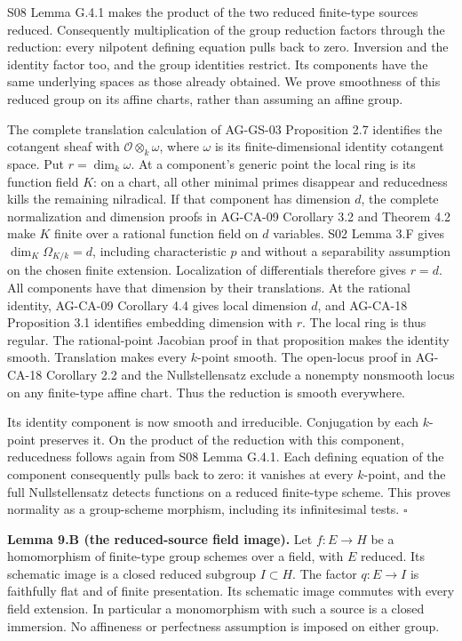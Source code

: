 \documentclass[11pt,a4paper,openany]{report}
\newcounter{none}
\begin{document}
S08 Lemma G.4.1 makes the product of the two reduced finite-type sources reduced. Consequently multiplication of the group reduction factors through the reduction: every nilpotent defining equation pulls back to zero. Inversion and the identity factor too, and the group identities restrict. Its components have the same underlying spaces as those already obtained. We prove smoothness of this reduced group on its affine charts, rather than assuming an affine group.

The complete translation calculation of AG-GS-03 Proposition 2.7 identifies the cotangent sheaf with \(\mathcal O\otimes_k\omega\), where \(\omega\) is its finite-dimensional identity cotangent space. Put \(r=\dim_k\omega\). At a component's generic point the local ring is its function field \(K\): on a chart, all other minimal primes disappear and reducedness kills the remaining nilradical. If that component has dimension \(d\), the complete normalization and dimension proofs in AG-CA-09 Corollary 3.2 and Theorem 4.2 make \(K\) finite over a rational function field on \(d\) variables. S02 Lemma 3.F gives \(\dim_K\Omega_{K/k}=d\), including characteristic \(p\) and without a separability assumption on the chosen finite extension. Localization of differentials therefore gives \(r=d\). All components have that dimension by their translations. At the rational identity, AG-CA-09 Corollary 4.4 gives local dimension \(d\), and AG-CA-18 Proposition 3.1 identifies embedding dimension with \(r\). The local ring is thus regular. The rational-point Jacobian proof in that proposition makes the identity smooth. Translation makes every \(k\)-point smooth. The open-locus proof in AG-CA-18 Corollary 2.2 and the Nullstellensatz exclude a nonempty nonsmooth locus on any finite-type affine chart. Thus the reduction is smooth everywhere.

Its identity component is now smooth and irreducible. Conjugation by each \(k\)-point preserves it. On the product of the reduction with this component, reducedness follows again from S08 Lemma G.4.1. Each defining equation of the component consequently pulls back to zero: it vanishes at every \(k\)-point, and the full Nullstellensatz detects functions on a reduced finite-type scheme. This proves normality as a group-scheme morphism, including its infinitesimal tests. \(\square\)

\textbf{Lemma 9.B (the reduced-source field image).} Let \(f:E\to H\) be a homomorphism of finite-type group schemes over a field, with \(E\) reduced. Its schematic image is a closed reduced subgroup \(I\subset H\). The factor \(q:E\to I\) is faithfully flat and of finite presentation. Its schematic image commutes with every field extension. In particular a monomorphism with such a source is a closed immersion. No affineness or perfectness assumption is imposed on either group.
\end{document}
